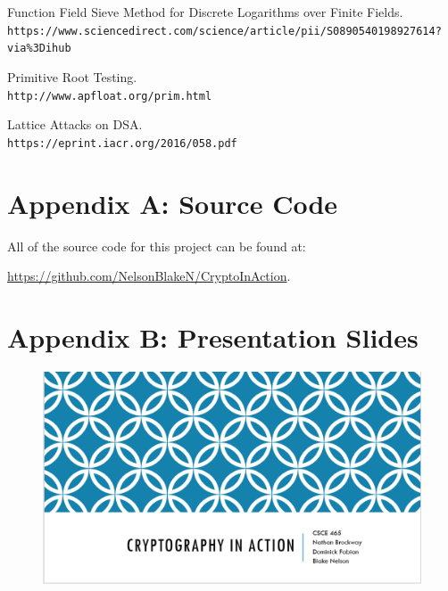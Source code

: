 \documentclass[12pt]{report}
\begin{document}
\begin{thebibliography}{9}
    Function Field Sieve Method for Discrete Logarithms over Finite Fields.\\
    \texttt{https://www.sciencedirect.com/science/article/pii/S0890540198927614?via\%3Dihub}

    Primitive Root Testing.\\
    \texttt{http://www.apfloat.org/prim.html}

    Lattice Attacks on DSA. \\
    \texttt{https://eprint.iacr.org/2016/058.pdf}

\end{thebibliography}

\newpage
\section{Appendix A: Source Code}
All of the source code for this project can be found at:

\href{https://github.com/NelsonBlakeN/CryptoInAction}{https://github.com/NelsonBlakeN/CryptoInAction}.

\section{Appendix B: Presentation Slides}

\begin{figure}[hp!] %
    \begin{center}
        \includegraphics[width=0.85\linewidth]{Pictures/slide1.PNG}
        \label{fig:slide1}
    \end{center}
\end{figure}
\end{document}
